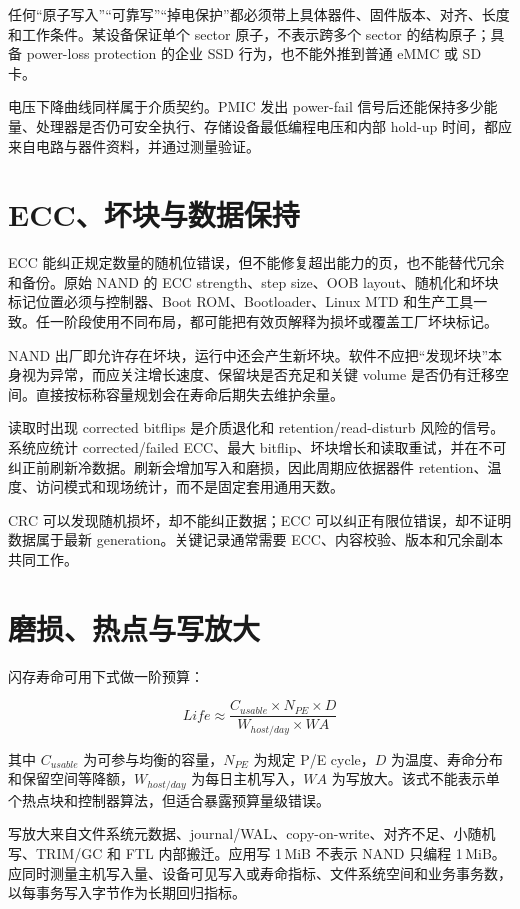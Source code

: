 任何“原子写入”“可靠写”“掉电保护”都必须带上具体器件、固件版本、对齐、长度和工作条件。某设备保证单个 sector 原子，不表示跨多个 sector 的结构原子；具备 power-loss protection 的企业 SSD 行为，也不能外推到普通 eMMC 或 SD 卡。

电压下降曲线同样属于介质契约。PMIC 发出 power-fail 信号后还能保持多少能量、处理器是否仍可安全执行、存储设备最低编程电压和内部 hold-up 时间，都应来自电路与器件资料，并通过测量验证。

\section{ECC、坏块与数据保持}

ECC 能纠正规定数量的随机位错误，但不能修复超出能力的页，也不能替代冗余和备份。原始 NAND 的 ECC strength、step size、OOB layout、随机化和坏块标记位置必须与控制器、Boot ROM、Bootloader、Linux MTD 和生产工具一致\cite{linux-mtd-doc}。任一阶段使用不同布局，都可能把有效页解释为损坏或覆盖工厂坏块标记。

NAND 出厂即允许存在坏块，运行中还会产生新坏块。软件不应把“发现坏块”本身视为异常，而应关注增长速度、保留块是否充足和关键 volume 是否仍有迁移空间。直接按标称容量规划会在寿命后期失去维护余量。

读取时出现 corrected bitflips 是介质退化和 retention/read-disturb 风险的信号。系统应统计 corrected/failed ECC、最大 bitflip、坏块增长和读取重试，并在不可纠正前刷新冷数据。刷新会增加写入和磨损，因此周期应依据器件 retention、温度、访问模式和现场统计，而不是固定套用通用天数。

CRC 可以发现随机损坏，却不能纠正数据；ECC 可以纠正有限位错误，却不证明数据属于最新 generation。关键记录通常需要 ECC、内容校验、版本和冗余副本共同工作。

\section{磨损、热点与写放大}

闪存寿命可用下式做一阶预算：

\begin{equation}
  Life \approx \frac{C_{usable}\times N_{PE}\times D}{W_{host/day}\times WA}
\end{equation}

其中 $C_{usable}$ 为可参与均衡的容量，$N_{PE}$ 为规定 P/E cycle，$D$ 为温度、寿命分布和保留空间等降额，$W_{host/day}$ 为每日主机写入，$WA$ 为写放大。该式不能表示单个热点块和控制器算法，但适合暴露预算量级错误。

写放大来自文件系统元数据、journal/WAL、copy-on-write、对齐不足、小随机写、TRIM/GC 和 FTL 内部搬迁。应用写 1\,MiB 不表示 NAND 只编程 1\,MiB。应同时测量主机写入量、设备可见写入或寿命指标、文件系统空间和业务事务数，以每事务写入字节作为长期回归指标。

